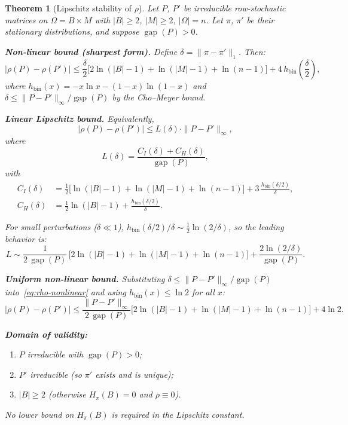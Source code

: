 \documentclass[11pt,a4paper]{article}
\newtheorem{theorem}{Theorem}
\DeclareMathOperator{\gap}{gap}
\begin{document}
\begin{theorem}[Lipschitz stability of $\rho$]\label{thm:lipschitz}
Let $P$, $P'$ be irreducible row-stochastic matrices on
$\Omega = B \times M$ with $|B| \ge 2$, $|M| \ge 2$, $|\Omega| = n$.
Let $\pi$, $\pi'$ be their stationary distributions, and suppose
$\gap(P) > 0$.

\medskip\noindent
\textbf{Non-linear bound (sharpest form).}
Define $\delta = \|\pi - \pi'\|_1$.  Then:
\begin{equation}\label{eq:rho-nonlinear}
  |\rho(P) - \rho(P')| \le
  \frac{\delta}{2}\bigl[2\ln(|B|-1) + \ln(|M|-1) + \ln(n-1)\bigr]
  + 4\,h_{\mathrm{bin}}\!\left(\frac{\delta}{2}\right),
\end{equation}
where $h_{\mathrm{bin}}(x) = -x\ln x - (1-x)\ln(1-x)$ and
$\delta \le \|P - P'\|_\infty / \gap(P)$ by the Cho--Meyer bound.

\medskip\noindent
\textbf{Linear Lipschitz bound.}
Equivalently,
\begin{equation}\label{eq:lipschitz-bound}
  |\rho(P) - \rho(P')| \le L(\delta) \cdot \|P - P'\|_\infty,
\end{equation}
where
\begin{equation}\label{eq:L-explicit}
  L(\delta) = \frac{C_I(\delta) + C_H(\delta)}{\gap(P)},
\end{equation}
with
\begin{align}
  C_I(\delta) &= \frac{1}{2}\bigl[\ln(|B|-1) + \ln(|M|-1) + \ln(n-1)\bigr]
         + 3\,\frac{h_{\mathrm{bin}}(\delta/2)}{\delta}, \label{eq:CI} \\
  C_H(\delta) &= \frac{1}{2}\ln(|B|-1) + \frac{h_{\mathrm{bin}}(\delta/2)}{\delta}. \label{eq:CH}
\end{align}

For small perturbations ($\delta \ll 1$),
$h_{\mathrm{bin}}(\delta/2)/\delta \sim \frac{1}{2}\ln(2/\delta)$,
so the leading behavior is:
\begin{equation}\label{eq:L-leading}
  L \sim \frac{1}{2\,\gap(P)}\,
  \bigl[2\ln(|B|-1) + \ln(|M|-1) + \ln(n-1)\bigr]
  + \frac{2\ln(2/\delta)}{\gap(P)}.
\end{equation}

\medskip\noindent
\textbf{Uniform non-linear bound.}
Substituting $\delta \le \|P-P'\|_\infty/\gap(P)$ into~\eqref{eq:rho-nonlinear}
and using $h_{\mathrm{bin}}(x) \le \ln 2$ for all $x$:
\begin{equation}\label{eq:rho-uniform}
  |\rho(P) - \rho(P')| \le
  \frac{\|P-P'\|_\infty}{2\,\gap(P)}\bigl[2\ln(|B|-1) + \ln(|M|-1)
  + \ln(n-1)\bigr] + 4\ln 2.
\end{equation}

\medskip\noindent
\textbf{Domain of validity:}
\begin{enumerate}
  \item $P$ irreducible with $\gap(P) > 0$;
  \item $P'$ irreducible (so $\pi'$ exists and is unique);
  \item $|B| \ge 2$ (otherwise $H_\pi(B) = 0$ and $\rho \equiv 0$).
\end{enumerate}
No lower bound on $H_\pi(B)$ is required in the Lipschitz constant.
\end{theorem}
\end{document}
